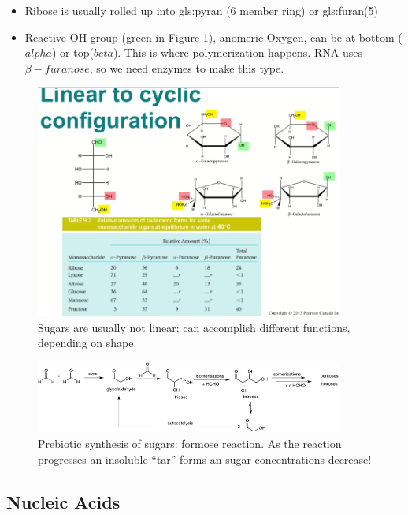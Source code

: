 \documentclass[]{article}
\begin{document}
\begin{itemize}
	\item Ribose is usually rolled up into \gls{gls:pyran} (6 member ring) or \gls{gls:furan}(5)
	\item Reactive OH group (green in Figure \ref{fig:SugarTautomers}), anomeric Oxygen, can be at bottom ($alpha$) or top($beta$). This is where polymerization happens. RNA uses $\beta-furanose$, so we need enzymes to make this type.
\end{itemize}
\begin{figure}[H]
	\caption[Sugars can accomplish different functions, depending on shape.]{Sugars are usually not linear: can accomplish different functions, depending on shape.}\label{fig:SugarTautomers} 
	\includegraphics[width=0.9\textwidth]{SugarTautomers}
\end{figure}

\begin{figure}[H]
	\caption[Prebiotic synthesis of sugars: formose reaction]{Prebiotic synthesis of sugars: formose reaction. As the reaction progresses an insoluble “tar” forms an sugar concentrations decrease!}\label{fig:SugarsPrebioticSynthesis} 
	\includegraphics[width=0.9\textwidth]{SugarsPrebioticSynthesis}
\end{figure}

\subsection{Nucleic Acids}
\end{document}
